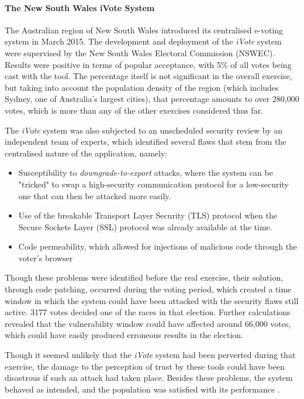 \documentclass[../access.tex]{subfiles}
\begin{document}
    \paragraph{The New South Wales iVote System}
    The Australian region of New South Wales introduced its centralised e-voting system in March 2015. The development and deployment of the \textit{iVote} system were supervised by the New South Wales Electoral Commission (NSWEC). Results were positive in terms of popular acceptance, with 5\% of all votes being cast with the tool. The percentage itself is not significant in the overall exercise, but taking into account the population density of the region (which includes Sydney, one of Australia's largest cities), that percentage amounts to over 280,000 votes, which is more than any of the other exercises considered thus far.
    \par
    The \textit{iVote} system was also subjected to an unscheduled security review by an independent team of experts, which identified several flaws that stem from the centralised nature of the application, namely:
    \begin{itemize}
        \item {Susceptibility to \textit{downgrade-to-export} attacks, where the system can be "tricked" to swap a high-security communication protocol for a low-security one that can then be attacked more easily.}
        \item {Use of the breakable Transport Layer Security (TLS) protocol when the Secure Sockets Layer (SSL) protocol was already available at the time.}
        \item {Code permeability, which allowed for injections of malicious code through the voter's browser}
    \end{itemize}
    Though these problems were identified before the real exercise, their solution, through code patching, occurred during the voting period, which created a time window in which the system could have been attacked with the security flaws still active. 3177 votes decided one of the races in that election. Further calculations revealed that the vulnerability window could have affected around 66,000 votes, which could have easily produced erroneous results in the election.
    \par
    Though it seemed unlikely that the \textit{iVote} system had been perverted during that exercise, the damage to the perception of trust by these tools could have been disastrous if such an attack had taken place. Besides these problems, the system behaved as intended, and the population was satisfied with its performance \cite{Halderman2015}.
\end{document}
